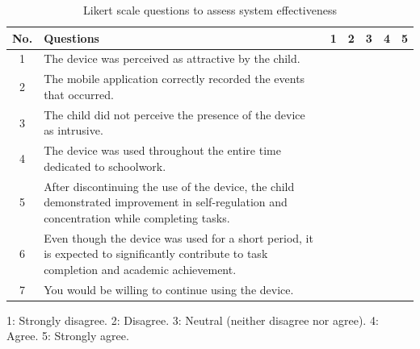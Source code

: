 			\begin{table}[h]
				\centering
				\caption{Likert scale questions to assess system effectiveness \label{tab:EffectivityQuestions}}	
				\begin{tabularx}{\textwidth}{c X c c c c c }
					\toprule
					\textbf{No.} & \textbf{Questions} & 1 & 2 & 3 & 4 & 5 \\
					\midrule
					1 & The device was perceived as attractive by the child.  & & & & &  \\
					2 & The mobile application correctly recorded the events that occurred.  & & & & &  \\
					3 & The child did not perceive the presence of the device as intrusive.  & & & & &  \\
					4 & The device was used throughout the entire time dedicated to schoolwork.  & & & & &  \\
					5 & After discontinuing the use of the device, the child demonstrated improvement in self-regulation and concentration while completing tasks.  & & & & &  \\
					6 & Even though the device was used for a short period, it is expected to significantly contribute to task completion and academic achievement.  & & & & &  \\
					7 & You would be willing to continue using the device.  & & & & &  \\
					\bottomrule
				\end{tabularx}
				\parbox{\textwidth}{\footnotesize 
					1: Strongly disagree. 2: Disagree. 3: Neutral (neither disagree nor agree). 4: Agree. 5: Strongly agree.
				}
			\end{table}


